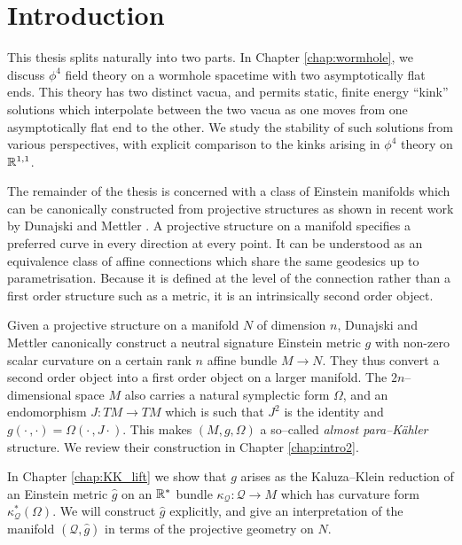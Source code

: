 

\chapter{Introduction}\label{chap:intro}


This thesis splits naturally into two parts. In Chapter \ref{chap:wormhole}, we discuss $\phi^4$ field theory on a wormhole spacetime with two asymptotically flat ends. This theory has two distinct vacua, and permits static, finite energy ``kink'' solutions which interpolate between the two vacua as one moves from one asymptotically flat end to the other. We study the stability of such solutions from various perspectives, with explicit comparison to the kinks arising in $\phi^4$ theory on $\mathbb{R}^{1,1}$.

The remainder of the thesis is concerned with a class of Einstein manifolds which can be canonically constructed from projective structures as shown in recent work by Dunajski and Mettler \cite{DM}. A projective structure on a manifold specifies a preferred curve in every direction at every point. It can be understood as an equivalence class of affine connections which share the same geodesics up to parametrisation. Because it is defined at the level of the connection rather than a first order structure such as a metric, it is an intrinsically second order object.

Given a projective structure on a manifold $N$ of dimension $n$,
Dunajski and Mettler \cite{DM} canonically construct a neutral signature Einstein metric $g$ with non-zero
scalar curvature on a certain rank $n$ affine bundle $M\rightarrow N$. They thus convert a second order object into a first order object on a larger manifold.
The $2n$--dimensional space $M$ also carries a natural symplectic form $\Omega$, and an endomorphism $J:TM\rightarrow TM$ which is such that $J^2$ is the identity and $g(\cdot\,,\cdot)=\Omega(\cdot\,,J\cdot)$. This makes $(M,g,\Omega)$ a so--called \textit{almost para--K\"ahler} structure. We review their construction in Chapter \ref{chap:intro2}.

In Chapter \ref{chap:KK_lift} we show that $g$ arises as the Kaluza--Klein reduction of an Einstein metric $\hat{g}$ on an $\mathbb{R}^*$ bundle $\kappa_\mathcal{Q}:\mathcal{Q}\rightarrow M$ which has curvature form $\kappa_\mathcal{Q}^*(\Omega)$. We will construct $\hat{g}$ explicitly, and give an interpretation of the manifold $(\mathcal{Q},\hat{g})$ in terms of the projective geometry on $N$.

